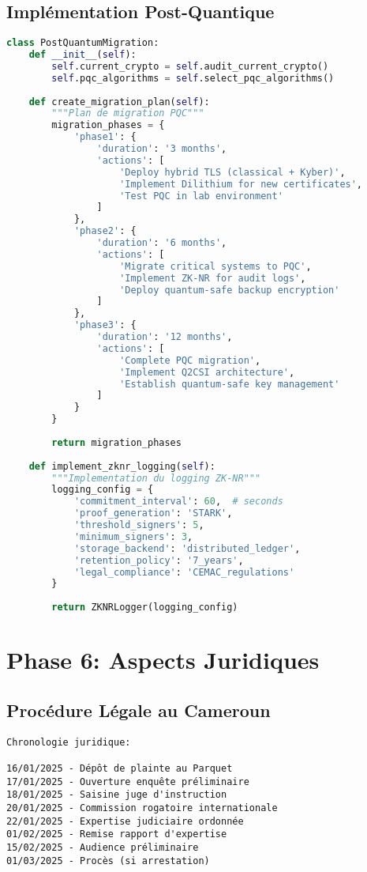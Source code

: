 \subsection{Implémentation Post-Quantique}
\begin{lstlisting}[language=Python, caption=Migration vers une infrastructure post-quantique]
class PostQuantumMigration:
    def __init__(self):
        self.current_crypto = self.audit_current_crypto()
        self.pqc_algorithms = self.select_pqc_algorithms()
    
    def create_migration_plan(self):
        """Plan de migration PQC"""
        migration_phases = {
            'phase1': {
                'duration': '3 months',
                'actions': [
                    'Deploy hybrid TLS (classical + Kyber)',
                    'Implement Dilithium for new certificates',
                    'Test PQC in lab environment'
                ]
            },
            'phase2': {
                'duration': '6 months',
                'actions': [
                    'Migrate critical systems to PQC',
                    'Implement ZK-NR for audit logs',
                    'Deploy quantum-safe backup encryption'
                ]
            },
            'phase3': {
                'duration': '12 months',
                'actions': [
                    'Complete PQC migration',
                    'Implement Q2CSI architecture',
                    'Establish quantum-safe key management'
                ]
            }
        }
        
        return migration_phases
    
    def implement_zknr_logging(self):
        """Implementation du logging ZK-NR"""
        logging_config = {
            'commitment_interval': 60,  # seconds
            'proof_generation': 'STARK',
            'threshold_signers': 5,
            'minimum_signers': 3,
            'storage_backend': 'distributed_ledger',
            'retention_policy': '7_years',
            'legal_compliance': 'CEMAC_regulations'
        }
        
        return ZKNRLogger(logging_config)
\end{lstlisting}

\section{Phase 6: Aspects Juridiques}
\subsection{Procédure Légale au Cameroun}
\begin{verbatim}
Chronologie juridique:

16/01/2025 - Dépôt de plainte au Parquet
17/01/2025 - Ouverture enquête préliminaire
18/01/2025 - Saisine juge d'instruction
20/01/2025 - Commission rogatoire internationale
22/01/2025 - Expertise judiciaire ordonnée
01/02/2025 - Remise rapport d'expertise
15/02/2025 - Audience préliminaire
01/03/2025 - Procès (si arrestation)
\end{verbatim}


